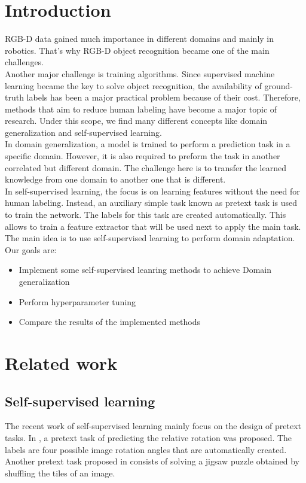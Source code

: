 \documentclass[conference]{IEEEtran}
\begin{document}
\section{Introduction}
RGB-D data gained much importance in different domains and mainly in robotics. That’s why RGB-D object recognition became one of the main challenges. \\
Another major challenge is training algorithms.
Since supervised machine learning became the key to solve object recognition, the availability of ground-truth labels has been a major practical problem because of their cost. Therefore, methods that aim to reduce human labeling have become a major topic of research. 
Under this scope, we find many different concepts like domain generalization and self-supervised learning.
\\
In domain generalization, a model is trained to perform a prediction task in a specific domain. However, it is also required to preform the task in another correlated but different domain. The challenge here is to transfer the learned knowledge from one domain to another one that is different.
\\
In self-supervised learning, the focus is on learning features without the need for human labeling. Instead, an auxiliary simple task known as pretext task is used to train the network. The labels for this task are created automatically. This allows to train a feature extractor that will be used next to apply the main task.
\\

The main idea is to use self-supervised learning to perform domain adaptation.\\

Our goals are:
\begin{itemize}
    \item Implement some self-supervised leanring methods to achieve Domain generalization
    \item Perform hyperparameter tuning\
    \item Compare the results of the implemented methods
\end{itemize}



\section{Related work}
\subsection{Self-supervised learning}
The recent work of self-supervised learning mainly focus on the design of pretext tasks. In \cite{b1}, a pretext task of predicting the relative rotation was proposed. The labels are four possible image rotation angles that are automatically created. Another pretext task proposed in \cite{b6} consists of solving a jigsaw puzzle obtained by shuffling the tiles of an image.  
\end{document}

